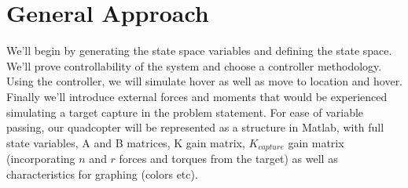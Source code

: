 \documentclass{article}
\begin{document}
\section*{General Approach}
We'll begin by generating the state space variables and defining the state space.  We'll prove controllability of the system and choose a controller methodology.  Using the controller, we will simulate hover as well as move to location and hover.  Finally we'll introduce external forces and moments that would be experienced simulating a target capture in the problem statement.  For ease of variable passing, our quadcopter will be represented as a structure in Matlab, with full state variables, A and B matrices, K gain matrix, $K_{capture}$ gain matrix (incorporating $n$ and $r$ forces and torques from the target) as well as characteristics for graphing (colors etc).
\end{document}
